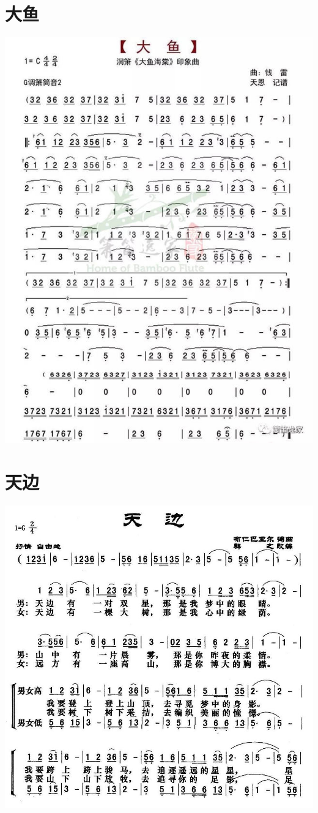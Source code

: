 \documentclass[cn,pad,chinese,chinesefont=nofont]{elegantbook}
\begin{document}
\section{大鱼}
    \includegraphics[width=\textwidth]{dongxiao/20200324大鱼.jpg}
\section{天边}
    \includegraphics[width=\textwidth]{dongxiao/20200324天边.jpg}
\end{document}
